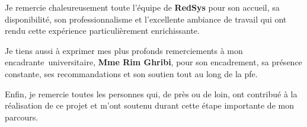 \par Je remercie chaleureusement toute l'équipe de \textbf{RedSys} pour son accueil, sa disponibilité, son professionnalisme et l'excellente ambiance de travail qui ont rendu cette expérience particulièrement enrichissante.

\vspace{0.5cm}

\par Je tiens aussi à exprimer mes plus profonds remerciements à mon encadrante universitaire, \textbf{Mme Rim Ghribi}, pour son encadrement, sa présence constante, ses recommandations et son soutien tout au long de la pfe.
\vspace{0.5cm}

\par Enfin, je remercie toutes les personnes qui, de près ou de loin, ont contribué à la réalisation de ce projet et m'ont soutenu durant cette étape importante de mon parcours.
